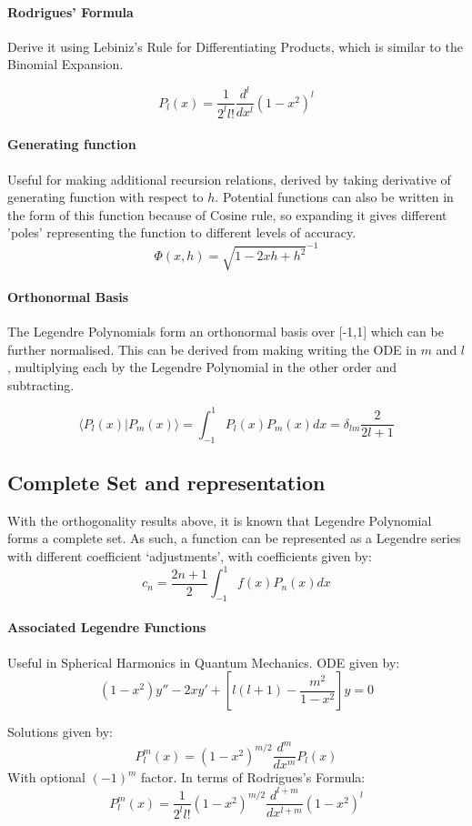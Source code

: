 \documentclass[12pt]{article}
\begin{document}
\paragraph{Rodrigues' Formula}
Derive it using Lebiniz's Rule for Differentiating Products, which is similar to the Binomial Expansion.

\[P_l(x) = \frac{1}{2^ll!}\frac{d^l}{dx^l}(1-x^2)^l\]

\paragraph{Generating function}
Useful for making additional recursion relations, derived by taking derivative of generating function with respect to $h$. Potential functions can also be written in the form of this function because of Cosine rule, so expanding it gives different 'poles' representing the function to different levels of accuracy.
\[ \Phi (x,h) = \sqrt{1 - 2xh + h^2}^{-1}\]


\paragraph{Orthonormal Basis}
The Legendre Polynomials form an orthonormal basis over [-1,1] which can be further normalised. This can be derived from making writing the ODE in $m$ and $l$, multiplying each by the Legendre Polynomial in the other order and subtracting.

\[ \langle P_l(x)|P_m(x)\rangle = \int^1_{-1} P_l(x)P_m(x)dx = \delta_{lm} \frac{2}{2l+1}\]

\subsection{Complete Set and representation}
With the orthogonality results above, it is known that Legendre Polynomial forms a complete set. As such, a function can be represented as a Legendre series with different coefficient  `adjustments', with coefficients given by:
\[ c_n = \frac{2n+1}{2}\int^1_{-1}f(x)P_n(x)dx\]
\paragraph{Associated Legendre Functions}
Useful in Spherical Harmonics in Quantum Mechanics. ODE given by:
\[ (1-x^2)y'' - 2xy' + [l(l+1) - \frac{m^2}{1-x^2}]y = 0 \]


Solutions given by:
\[P^m_l(x) = (1-x^2)^{m/2}\frac{d^m}{dx^m}P_l(x)\]
With optional $(-1)^m$ factor. In terms of Rodrigues's Formula:
\[P^m_l(x) = \frac{1}{2^ll!}(1-x^2)^{m/2}\frac{d^{l+m}}{dx^{l+m}}(1-x^2)^l\]
\end{document}
